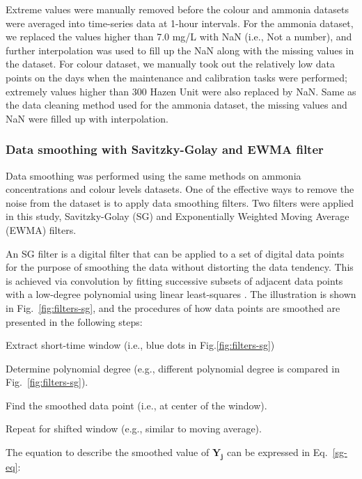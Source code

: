 Extreme values were manually removed before the colour and ammonia datasets were averaged into time-series data at 1-hour intervals. For the ammonia dataset, we replaced the values higher than 7.0 mg/L with NaN (i.e., Not a number), and further interpolation was used to fill up the NaN along with the missing values in the dataset. For colour dataset, we manually took out the relatively low data points on the days when the maintenance and calibration tasks were performed; extremely values higher than 300 Hazen Unit were also replaced by NaN. Same as the data cleaning method used for the ammonia dataset, the missing values and NaN were filled up with interpolation.

\subsubsection{Data smoothing with Savitzky-Golay and EWMA filter}
Data smoothing was performed using the same methods on ammonia concentrations and colour levels datasets. One of the effective ways to remove the noise from the dataset is to apply data smoothing filters. Two filters were applied in this study, Savitzky-Golay (SG) and Exponentially Weighted Moving Average (EWMA) filters.

An SG filter is a digital filter that can be applied to a set of digital data points for the purpose of smoothing the data without distorting the data tendency. This is achieved via convolution by fitting successive subsets of adjacent data points with a low-degree polynomial using linear least-squares \citep{wikipediaSavitzkyGolayFilter2022}. The illustration is shown in Fig.~\ref{fig:filters-sg}, and the procedures of how data points are smoothed are presented in the following steps:

\noindent
\begin{myenumerate}
    \item Extract short-time window (i.e., blue dots in Fig.\ref{fig:filters-sg})
    \item Determine polynomial degree (e.g., different polynomial degree is compared in Fig.~\ref{fig:filters-sg}).
    \item Find the smoothed data point (i.e., at center of the window).
    \item Repeat for shifted window (e.g., similar to moving average).
\end{myenumerate}

The equation to describe the smoothed value of $\bm{Y_j}$ can be expressed in Eq.~\ref{sg-eq}:

